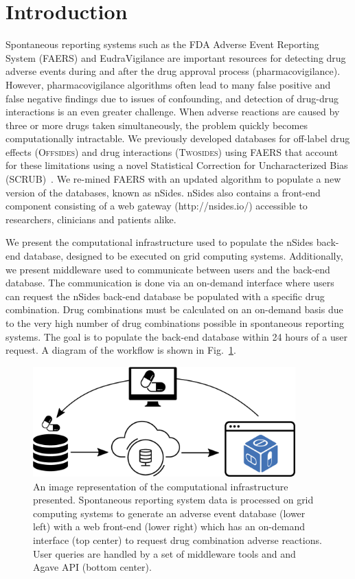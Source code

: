 \documentclass{ws-procs11x85}
\begin{document}
\bodymatter

\section{Introduction}

Spontaneous reporting systems such as the FDA Adverse Event Reporting
System (FAERS) and EudraVigilance are important resources for
detecting drug adverse events during and after the drug approval
process (pharmacovigilance). However, pharmacovigilance algorithms
often lead to many false positive and false negative findings due to
issues of confounding, and detection of drug-drug interactions is an
even greater challenge. When adverse reactions are caused by three or
more drugs taken simultaneously, the problem quickly becomes
computationally intractable. We previously developed databases for
off-label drug effects (O\textsc{ffsides}) and drug interactions
(T\textsc{wosides}) using FAERS that account for these limitations
using a novel Statistical Correction for Uncharacterized Bias
(SCRUB)~\cite{Tatonetti2012}.  We re-mined FAERS with an updated
algorithm to populate a new version of the databases, known as nSides.
nSides also contains a front-end component consisting of a web gateway
(http://nsides.io/) accessible to researchers, clinicians and patients
alike.

We present the computational infrastructure used to populate the
nSides back-end database, designed to be executed on grid computing
systems. Additionally, we present middleware used to communicate
between users and the back-end database.  The communication is done
via an on-demand interface where users can request the nSides back-end
database be populated with a specific drug combination. Drug
combinations must be calculated on an on-demand basis due to the very
high number of drug combinations possible in spontaneous reporting
systems. The goal is to populate the back-end database within 24 hours
of a user request. A diagram of the workflow is shown in
Fig.~\ref{fig:workflow}.

\begin{figure}[h]
\centerline{\includegraphics[width=0.9\textwidth]{workflow}}
\caption{An image representation of the computational infrastructure
  presented. Spontaneous reporting system data is processed on grid
  computing systems to generate an adverse event database (lower left) with a web
  front-end (lower right) which has an on-demand interface (top center) to request drug
  combination adverse reactions. User queries are handled by a set of middleware tools and and Agave API (bottom center).}
\label{fig:workflow}
\end{figure}
\end{document}
